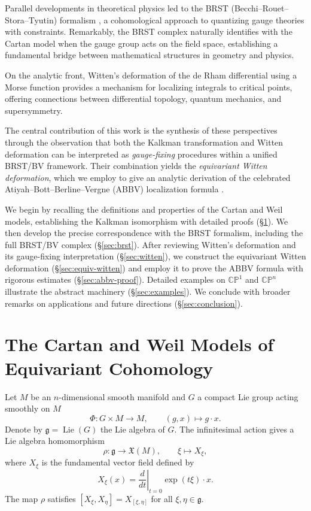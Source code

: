 \documentclass[10pt]{article}
\theoremstyle{definition}
\begin{document}
Parallel developments in theoretical physics led to the BRST (Becchi--Rouet--Stora--Tyutin) formalism \cite{BecchiRouetStora1975, Tyutin1975}, a cohomological approach to quantizing gauge theories with constraints. Remarkably, the BRST complex naturally identifies with the Cartan model when the gauge group acts on the field space, establishing a fundamental bridge between mathematical structures in geometry and physics.

On the analytic front, Witten's deformation of the de Rham differential using a Morse function \cite{Witten1982} provides a mechanism for localizing integrals to critical points, offering connections between differential topology, quantum mechanics, and supersymmetry.

The central contribution of this work is the synthesis of these perspectives through the observation that both the Kalkman transformation and Witten deformation can be interpreted as \emph{gauge-fixing} procedures within a unified BRST/BV framework. Their combination yields the \emph{equivariant Witten deformation}, which we employ to give an analytic derivation of the celebrated Atiyah--Bott--Berline--Vergne (ABBV) localization formula \cite{AtiyahBott1984, BerlineVergne1982}.

We begin by recalling the definitions and properties of the Cartan and Weil models, establishing the Kalkman isomorphism with detailed proofs (\S\ref{sec:models}). We then develop the precise correspondence with the BRST formalism, including the full BRST/BV complex (\S\ref{sec:brst}). After reviewing Witten's deformation and its gauge-fixing interpretation (\S\ref{sec:witten}), we construct the equivariant Witten deformation (\S\ref{sec:equiv-witten}) and employ it to prove the ABBV formula with rigorous estimates (\S\ref{sec:abbv-proof}). Detailed examples on $\mathbb{CP}^1$ and $\mathbb{CP}^n$ illustrate the abstract machinery (\S\ref{sec:examples}). We conclude with broader remarks on applications and future directions (\S\ref{sec:conclusion}).

\section{The Cartan and Weil Models of Equivariant Cohomology}\label{sec:models}
Let $M$ be an $n$-dimensional smooth manifold and $G$ a compact Lie group acting smoothly on $M$
\begin{equation}\label{eq:group-action}
    \Phi: G \times M \longrightarrow M, \qquad (g, x) \longmapsto g \cdot x.
\end{equation}
Denote by $\mathfrak{g} = \operatorname{Lie}(G)$ the Lie algebra of $G$. The infinitesimal action gives a Lie algebra homomorphism
\begin{equation}\label{eq:infinitesimal-action}
    \rho: \mathfrak{g} \longrightarrow \mathfrak{X}(M), \qquad \xi \longmapsto X_{\xi},
\end{equation}
where $X_{\xi}$ is the fundamental vector field defined by
\begin{equation}
X_{\xi}(x) = \left.\frac{d}{dt}\right|_{t=0} \exp(t\xi)\cdot x.
\end{equation}
The map $\rho$ satisfies $[X_{\xi}, X_{\eta}] = X_{[\xi,\eta]}$ for all $\xi, \eta \in \mathfrak{g}$.
\end{document}
